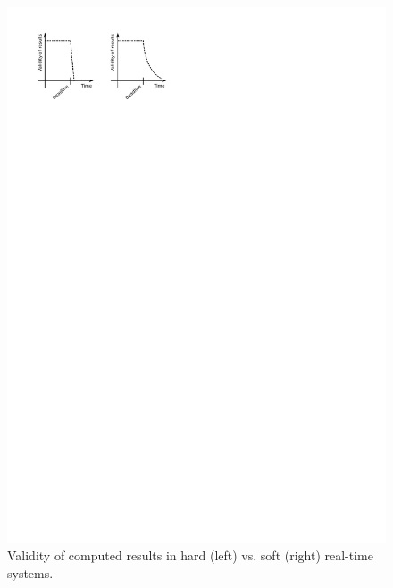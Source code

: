 \begin{figure}
\centering
\includegraphics{figs/hard_vs_soft}
\caption{Validity of computed results in hard (left) vs. soft (right)
  real-time systems.}
\label{fig:hard_vs_soft}
\end{figure}

